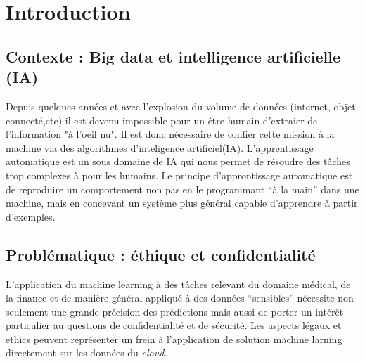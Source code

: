 \documentclass[a4paper,12pt]{article}
\begin{document}
\newpage
\section{Introduction}
\subsection{Contexte : Big data et intelligence artificielle (IA)}
Depuis quelques années  et avec l'explosion du volume de données (internet, objet connecté,etc) il est devenu impossible pour un être humain d'extraier de l'information "à l'oeil nu".  
Il est donc nécessaire de confier cette mission à la machine via des algorithmes d'inteligence artificiel(IA).
L'apprentissage automatique est un sous domaine de IA qui nous permet de résoudre des tâches trop complexes à pour les humains.\newline    
Le principe d'approntissage automatique est de reproduire un comportement non pas en le programmant “à la main” dans une machine, mais en concevant un système plus général capable d’apprendre à partir d’exemples.
\subsection{Problématique : éthique et confidentialité}
L'application du machine learning à des tâches relevant du domaine  médical, de la finance et de manière général appliqué à des données ``sensibles'' nécessite non seulement une grande précision des prédictions mais aussi de porter un intérêt particulier au questions de confidentialité et de sécurité. Les aspects légaux et ethics peuvent représenter un frein à l'application de solution machine larning directement sur les données du \textit{cloud}.\\
\end{document}
